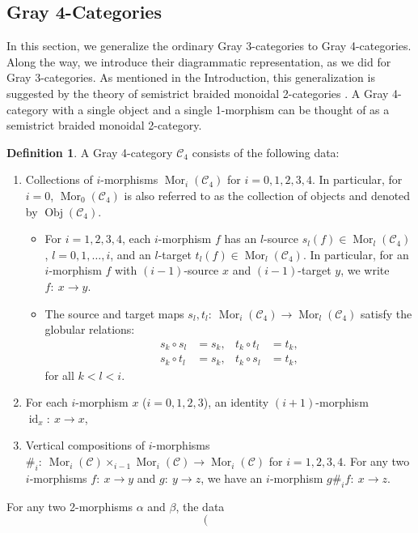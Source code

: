\documentclass[11pt, reqno]{amsart} %
\newcommand{\obj}{{\mathop{\mathrm{Obj}}}}
\newcommand{\mor}{{\mathop{\mathrm{Mor}}}}
\newcommand{\id}{{\mathop{\mathrm{id}}}}
\newcommand{\cC}{{\mathcal{C}}}
\theoremstyle{definition}
\newtheorem{definition}[theorem]{Definition}
\theoremstyle{remark}
\numberwithin{equation}{section}
\begin{document}
\subsection{Gray 4-Categories} \label{sec:Gray4}
In this section, we generalize the ordinary Gray 3-categories to Gray 4-categories. Along the way, we introduce their diagrammatic representation, as we did for Gray 3-categories. As mentioned in the Introduction, this generalization is suggested by the theory of semistrict braided monoidal 2-categories \cite{Kapranov:1994,Baez:1996,Crans:1998}. A Gray 4-category with a single object and a single 1-morphism can be thought of as a semistrict braided monoidal 2-category.

\begin{definition}
\label{def:Gray4}
A Gray 4-category $\cC_4$ consists of the following data:
\begin{enumerate}
  \item Collections of $i$-morphisms $\mor_i(\cC_4)$ for $i=0,1,2,3,4$. In particular, for $i=0$, $\mor_0(\cC_4)$ is also referred to as the collection of objects and denoted by $\obj(\cC_4)$.
  \begin{itemize}
    \item For $i=1,2,3,4$, each $i$-morphism $f$ has an $l$-source $s_l(f)\in \mor_l(\cC_4)$, $l=0,1,\ldots,i$, and an $l$-target $t_l(f)\in \mor_l(\cC_4)$. In particular, for an $i$-morphism $f$ with $(i-1)$-source $x$ and $(i-1)$-target $y$, we write $f:~x\to y$.
    \item The source and target maps $s_l,t_l:~\mor_i(\cC_4)\to\mor_l(\cC_4)$ satisfy the globular relations:
    \begin{align}
      \nonumber
      s_k\circ s_l &= s_k, & t_k\circ t_l &= t_k, \\
      \nonumber
      s_k\circ t_l &= s_k, & t_k\circ s_l &= t_k,
    \end{align}
    for all $k<l<i$. 
  \end{itemize}
  \item For each $i$-morphism $x$ ($i=0,1,2,3$), an identity $(i+1)$-morphism $\id_x:~x\to x$,
  \item Vertical compositions of $i$-morphisms $\#_i:~\mor_i(\cC)\times_{i-1} \mor_i(\cC) \to \mor_i(\cC)$ for $i=1,2,3,4$. For any two $i$-morphisms $f:~x\to y$ and $g:~y\to z$, we have an $i$-morphism $g\#_i f:~x\to z$. 
\end{enumerate}
For any two 2-morphisms $\alpha$ and $\beta$, the data 
\[
  \left(
    \begin{array}{l}

\end{array}\]
\end{definition}
\end{document}

